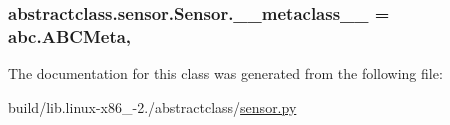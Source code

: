 \subsubsection[{\+\_\+\+\_\+metaclass\+\_\+\+\_\+}]{\setlength{\rightskip}{0pt plus 5cm}abstractclass.\+sensor.\+Sensor.\+\_\+\+\_\+metaclass\+\_\+\+\_\+ = abc.\+A\+B\+C\+Meta\hspace{0.3cm}{\ttfamily [static]}, {\ttfamily [private]}}\label{classabstractclass_1_1sensor_1_1Sensor_a3dfb046dc96fafc8744a98d3858c275f}


The documentation for this class was generated from the following file\+:\begin{DoxyCompactItemize}
\item 
build/lib.\+linux-\/x86\+\_-\/2./abstractclass/\hyperlink{build_2lib_8linux-x86__64-2_87_2abstractclass_2sensor_8py}{sensor.\+py}\end{DoxyCompactItemize}
